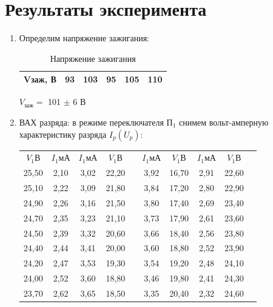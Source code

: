 \newpage
\section{Результаты эксперимента}
\begin{enumerate}
    \item  Определим напряжение зажигания:
    \begin{table}[!ht]
    \centering
    \begin{tabular}{|c|c|c|c|c|c|}
    \hline
    Vзаж, В & 93 & 103 & 95 & 105 & 110 \\ \hline
    \end{tabular}
    \caption{Напряжение зажигания}
    \end{table}
    $V_{заж} =$ 101 $\pm$ 6 В
    \item ВАХ разряда: в режиме переключателя $\text{П}_1$ снимем вольт-амперную характеристику разряда $I_p(U_p)$:
\begin{table}[!ht]
\centering
\begin{tabular}{|c|c|c|c|c|c|c|c|c|c|}
\cline{1-9}
$V_1 \text{В}$  & $I_1 \text{мА}$ &$ I_1 \text{мА}$ & $V_1 \text{В}$ &  & $I_1 \text{мА}$ &$ V_1 \text{В}$ & $I_1 \text{мА}$ & $V_1 \text{В}    $           \\ \cline{1-9}
25,50  & 2,10    & 3,02    & 22,20  &  & 3,92    & 16,70  & 2,91    & 22,60                \\ \cline{1-9}
25,10  & 2,22    & 3,09    & 21,80  &  & 3,84    & 17,20  & 2,80    & 22,90                \\ \cline{1-9}
24,90  & 2,26    & 3,16    & 21,50  &  & 3,80    & 17,40  & 2,69    & 23,40                \\ \cline{1-9}
24,70  & 2,35    & 3,23    & 21,10  &  & 3,73    & 17,90  & 2,61    & 23,60                \\ \cline{1-9}
24,50  & 2,39    & 3,32    & 20,60  &  & 3,66    & 18,40  & 2,56    & 23,80                \\ \cline{1-9}
24,40  & 2,44    & 3,41    & 20,00  &  & 3,60    & 18,80  & 2,52    & 23,90                \\ \cline{1-9}
24,20  & 2,47    & 3,53    & 19,30  &  & 3,54    & 19,20  & 2,48    & 24,10                \\ \cline{1-9}
24,00  & 2,52    & 3,60    & 18,80  &  & 3,46    & 19,80  & 2,41    & 24,30                \\ \cline{1-9}
23,70  & 2,62    & 3,65    & 18,50  &  & 3,35    & 20,40  & 2,32    & 24,60                \\ \cline{1-9}

\end{tabular}
\end{table}
\end{enumerate}
